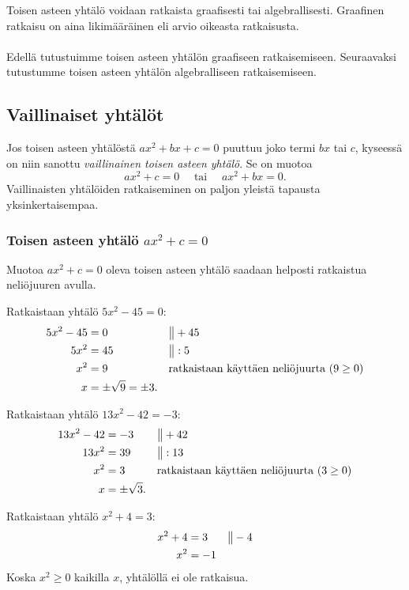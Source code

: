 Toisen asteen yhtälö voidaan ratkaista graafisesti tai algebrallisesti. Graafinen ratkaisu on aina likimääräinen eli arvio oikeasta ratkaisusta. \\ \\ 
Edellä tutustuimme toisen asteen yhtälön graafiseen ratkaisemiseen. Seuraavaksi tutustumme toisen asteen yhtälön algebralliseen ratkaisemiseen.

\subsection*{Vaillinaiset yhtälöt}
Jos toisen asteen yhtälöstä $ax^2+bx+c=0$ puuttuu joko termi $bx$ tai $c$, 
kyseessä on niin sanottu \emph{vaillinainen toisen asteen yhtälö}. Se on muotoa
\[ax^2+c=0 \quad \text{ tai } \quad ax^2+bx=0.\]
Vaillinaisten yhtälöiden ratkaiseminen on paljon yleistä tapausta yksinkertaisempaa.

\subsubsection*{Toisen asteen yhtälö $ax^2+c=0$}
Muotoa $ax^2+c = 0$ oleva toisen asteen yhtälö saadaan helposti ratkaistua neliöjuuren avulla.

\begin{esimerkki}
Ratkaistaan yhtälö $5x^2-45=0$:
\begin{align*}
5x^2-45 &= 0 &&\big\| + 45 \\
5x^2 &= 45 &&\big\| : 5 \\
x^2 &= 9 &&\text{ratkaistaan käyttäen neliöjuurta ($9 \geq 0$)} \\
x &= \pm \sqrt{9} = \pm 3.
\end{align*}
\end{esimerkki}

\begin{esimerkki}
Ratkaistaan yhtälö $13x^2-42=-3$:
\begin{align*}
13x^2-42 &= -3 &&\big\| + 42 \\
13x^2 &= 39 &&\big\| : 13 \\
x^2 &= 3 &&\text{ratkaistaan käyttäen neliöjuurta ($3 \geq 0$)} \\
x &= \pm \sqrt{3}.
\end{align*}
\end{esimerkki}

\begin{esimerkki}
Ratkaistaan yhtälö $x^2+4=3$:
\begin{align*}
x^2+4 &= 3 &&\big\| - 4 \\
x^2 &= -1
\end{align*}
Koska $x^2 \geq 0$ kaikilla $x$, yhtälöllä ei ole ratkaisua.
\end{esimerkki}

